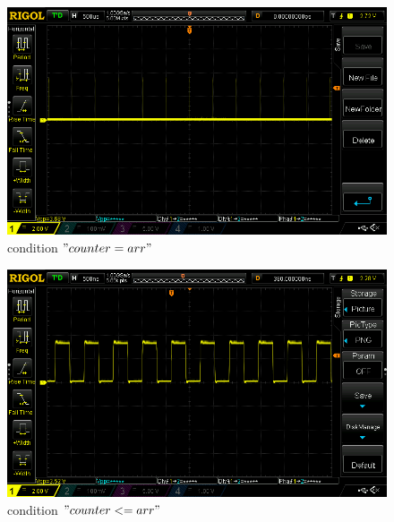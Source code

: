 \documentclass[12pt]{article}
\begin{document}
\begin{figure}[h!]
	
	\includegraphics[scale = 0.4]{immagini/NewFile1}
	\caption{condition $"counter=arr"$ }
\end{figure}

\begin{figure}[h!]
	
	\includegraphics[scale = 0.4]{immagini/DS1Z_QuickPrint1}
	\caption{condition $"counter<=arr"$ }
\end{figure}
\end{document}
